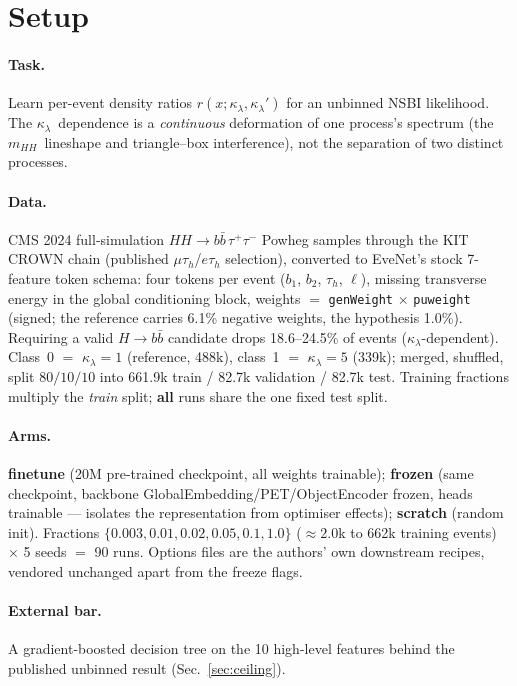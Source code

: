 \documentclass[11pt]{article}
\newcommand{\kl}{\ensuremath{\kappa_\lambda}}
\newcommand{\bbtt}{\ensuremath{b\bar b\,\tau^+\tau^-}}
\newcommand{\tauh}{\ensuremath{\tau_h}}
\newcommand{\mhh}{\ensuremath{m_{HH}}}
\begin{document}
\tableofcontents

\section{Setup}
\label{sec:setup}

\paragraph{Task.} Learn per-event density ratios $r(x;\kl,\kl')$ for an unbinned NSBI
likelihood. The \kl\ dependence is a \emph{continuous} deformation of one process's
spectrum (the \mhh\ lineshape and triangle--box interference), not the separation of two
distinct processes.

\paragraph{Data.} CMS 2024 full-simulation $HH\to\bbtt$ Powheg samples through the KIT
CROWN chain (published $\mu\tau_h$/$e\tau_h$ selection), converted to EveNet's stock
7-feature token schema: four tokens per event ($b_1$, $b_2$, \tauh, $\ell$), missing
transverse energy in the global conditioning block, weights $=$ \texttt{genWeight}
$\times$ \texttt{puweight} (signed; the reference carries 6.1\% negative weights, the
hypothesis 1.0\%). Requiring a valid $H\to b\bar b$ candidate drops 18.6--24.5\% of events
(\kl-dependent). Class~0 $=$ \kl$=1$ (reference, 488k), class~1 $=$ \kl$=5$ (339k); merged,
shuffled, split $80/10/10$ into 661.9k train / 82.7k validation / 82.7k test. Training
fractions multiply the \emph{train} split; \textbf{all} runs share the one fixed test split.

\paragraph{Arms.} \textbf{finetune} (20M pre-trained checkpoint, all weights trainable);
\textbf{frozen} (same checkpoint, backbone GlobalEmbedding/PET/ObjectEncoder frozen, heads
trainable --- isolates the representation from optimiser effects); \textbf{scratch} (random
init). Fractions $\{0.003, 0.01, 0.02, 0.05, 0.1, 1.0\}$ ($\approx 2.0$k to 662k training
events) $\times$ 5 seeds $=$ 90 runs. Options files are the authors' own downstream recipes,
vendored unchanged apart from the freeze flags.

\paragraph{External bar.} A gradient-boosted decision tree on the 10 high-level features
behind the published unbinned result (Sec.~\ref{sec:ceiling}).
\end{document}
